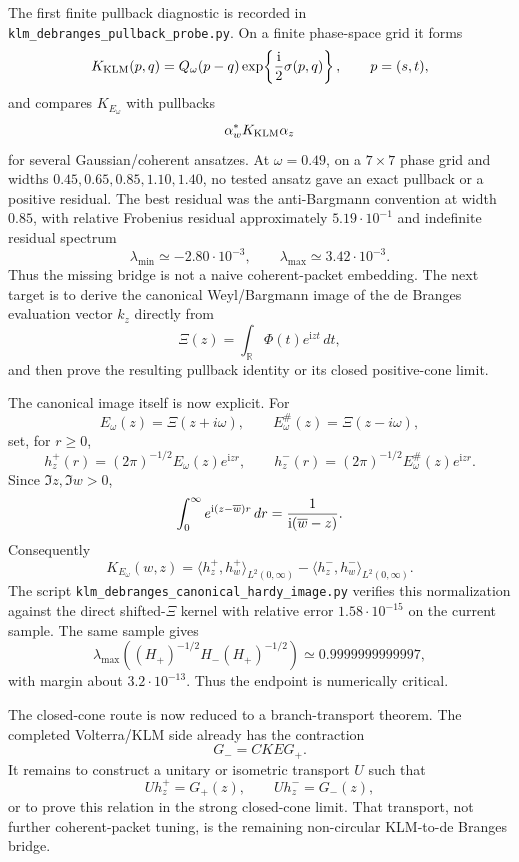 \documentclass[11pt]{article}
\newcommand{\ii}{\mathrm i}
\begin{document}
The first finite pullback diagnostic is recorded in
\texttt{klm\_debranges\_pullback\_probe.py}.  On a finite phase-space grid it
forms
\[
  K_{\rm KLM}(p,q)=Q_\omega(p-q)
  \exp\!\left\{ {\ii\over2}\sigma(p,q)\right\},
  \qquad p=(s,t),
\]
and compares \(K_{E_\omega}\) with pullbacks
\[
  \alpha_w^\ast K_{\rm KLM}\alpha_z
\]
for several Gaussian/coherent ansatzes.  At \(\omega=0.49\), on a \(7\times7\)
phase grid and widths \(0.45,0.65,0.85,1.10,1.40\), no tested ansatz gave an
exact pullback or a positive residual.  The best residual was the
anti-Bargmann convention at width \(0.85\), with relative Frobenius residual
approximately \(5.19\cdot10^{-1}\) and indefinite residual spectrum
\[
  \lambda_{\min}\simeq -2.80\cdot10^{-3},\qquad
  \lambda_{\max}\simeq 3.42\cdot10^{-3}.
\]
Thus the missing bridge is not a naive coherent-packet embedding.  The next
target is to derive the canonical Weyl/Bargmann image of the de Branges
evaluation vector \(k_z\) directly from
\[
  \Xi(z)=\int_{\mathbb R}\Phi(t)e^{\ii zt}\,dt,
\]
and then prove the resulting pullback identity or its closed positive-cone
limit.

The canonical image itself is now explicit.  For
\[
  E_\omega(z)=\Xi(z+i\omega),\qquad
  E_\omega^\#(z)=\Xi(z-i\omega),
\]
set, for \(r\ge0\),
\[
  h_z^+(r)=(2\pi)^{-1/2}E_\omega(z)e^{\ii zr},
  \qquad
  h_z^-(r)=(2\pi)^{-1/2}E_\omega^\#(z)e^{\ii zr}.
\]
Since \(\Im z,\Im w>0\),
\[
  \int_0^\infty e^{\ii(z-\overline w)r}\,dr
  ={1\over \ii(\overline w-z)}.
\]
Consequently
\[
  K_{E_\omega}(w,z)
   =\langle h_z^+,h_w^+\rangle_{L^2(0,\infty)}
    -\langle h_z^-,h_w^-\rangle_{L^2(0,\infty)}.
\]
The script \texttt{klm\_debranges\_canonical\_hardy\_image.py} verifies this
normalization against the direct shifted-\(\Xi\) kernel with relative error
\(1.58\cdot10^{-15}\) on the current sample.  The same sample gives
\[
  \lambda_{\max}\!\left((H_+)^{-1/2}H_-(H_+)^{-1/2}\right)
  \simeq 0.9999999999997,
\]
with margin about \(3.2\cdot10^{-13}\).  Thus the endpoint is numerically
critical.

The closed-cone route is now reduced to a branch-transport theorem.  The
completed Volterra/KLM side already has the contraction
\[
  G_- = C K E G_+.
\]
It remains to construct a unitary or isometric transport \(U\) such that
\[
  U h_z^+=G_+(z),\qquad U h_z^-=G_-(z),
\]
or to prove this relation in the strong closed-cone limit.  That transport,
not further coherent-packet tuning, is the remaining non-circular
KLM-to-de Branges bridge.
\end{document}
